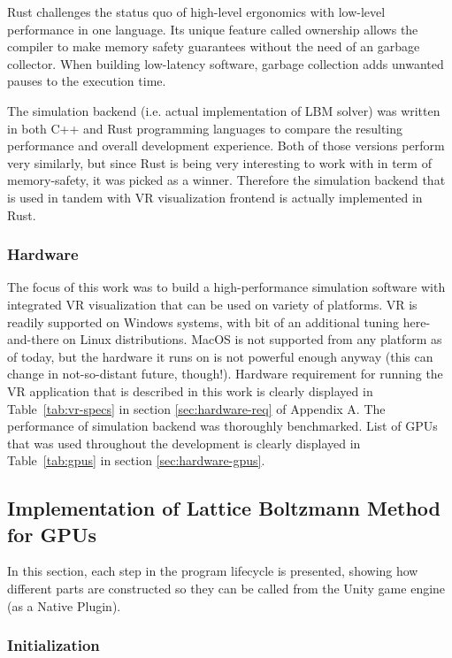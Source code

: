 Rust challenges the status quo of high-level ergonomics with low-level performance in one language. Its unique feature called ownership allows the compiler to make memory safety guarantees without the need of an garbage collector. When building low-latency software, garbage collection adds unwanted pauses to the execution time. 

The simulation backend (i.e. actual implementation of LBM solver) was written in both C++ and Rust programming languages to compare the resulting performance and overall development experience. Both of those versions perform very similarly, but since Rust is being very interesting to work with in term of memory-safety, it was picked as a winner. Therefore the simulation backend that is used in tandem with VR visualization frontend is actually implemented in Rust. 

\subsubsection{Hardware}
The focus of this work was to build a high-performance simulation software with integrated VR visualization that can be used on variety of platforms. VR is readily supported on Windows systems, with bit of an additional tuning here-and-there on Linux distributions. MacOS is not supported from any platform as of today, but the hardware it runs on is not powerful enough anyway (this can change in not-so-distant future, though!). Hardware requirement for running the VR application that is described in this work is clearly displayed in Table~\ref{tab:vr-specs} in section \ref{sec:hardware-req} of Appendix A. The performance of simulation backend was thoroughly benchmarked. List of GPUs that was used throughout the development is clearly displayed in Table~\ref{tab:gpus} in section \ref{sec:hardware-gpus}.


\subsection{Implementation of Lattice Boltzmann Method for GPUs}
In this section, each step in the program lifecycle is presented, showing how different parts are constructed so they can be called from the Unity game engine (as a Native Plugin).

\subsubsection{Initialization}

